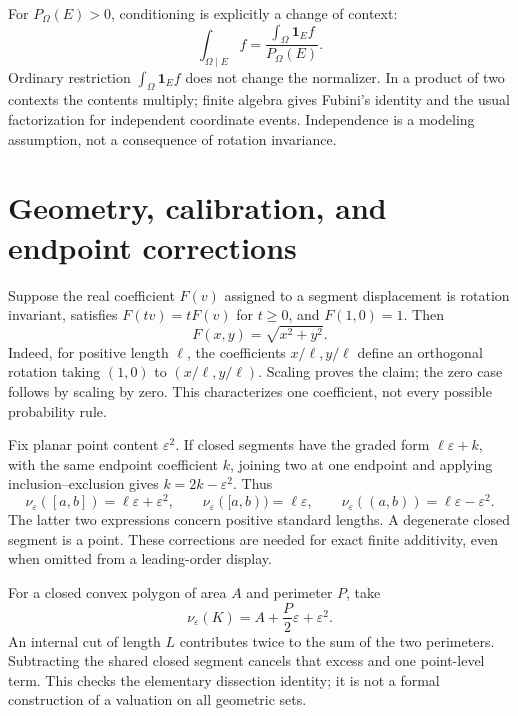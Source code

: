 \documentclass[11pt]{article}
\theoremstyle{definition}
\theoremstyle{remark}
\newcommand{\eps}{\varepsilon}
\newcommand{\nuE}{\nu_{\eps}}
\begin{document}
For $P_\Omega(E)>0$, conditioning is explicitly a change of context:
\[
 \int_{\Omega\mid E}f=
 \frac{\int_\Omega\mathbf1_E f}{P_\Omega(E)}.
\]
Ordinary restriction $\int_\Omega\mathbf1_E f$ does not change the
normalizer. In a product of two contexts the contents multiply;
finite algebra gives Fubini's identity and the usual factorization for
independent coordinate events. Independence is a modeling assumption,
not a consequence of rotation invariance.

\section{Geometry, calibration, and endpoint corrections}
Suppose the real coefficient $F(v)$ assigned to a segment displacement
is rotation invariant, satisfies $F(tv)=tF(v)$ for $t\geq0$, and
$F(1,0)=1$. Then
\[
 F(x,y)=\sqrt{x^2+y^2}.
\]
Indeed, for positive length $\ell$, the coefficients $x/\ell,y/\ell$
define an orthogonal rotation taking $(1,0)$ to $(x/\ell,y/\ell)$.
Scaling proves the claim; the zero case follows by scaling by zero.
This characterizes one coefficient, not every possible probability rule.

Fix planar point content $\eps^2$. If closed segments have the graded
form $\ell\eps+k$, with the same endpoint coefficient $k$, joining two
at one endpoint and applying inclusion--exclusion gives
$k=2k-\eps^2$. Thus
\begin{equation}\label{eq:segments}
 \nuE([a,b])=\ell\eps+\eps^2,\qquad
 \nuE([a,b))=\ell\eps,\qquad
 \nuE((a,b))=\ell\eps-\eps^2.
\end{equation}
The latter two expressions concern positive standard lengths. A
degenerate closed segment is a point. These corrections are needed for
exact finite additivity, even when omitted from a leading-order display.

For a closed convex polygon of area $A$ and perimeter $P$, take
\begin{equation}\label{eq:polygon}
 \nuE(K)=A+\frac P2\eps+\eps^2.
\end{equation}
An internal cut of length $L$ contributes twice to the sum of the two
perimeters. Subtracting the shared closed segment cancels that excess
and one point-level term. This checks the elementary dissection identity;
it is not a formal construction of a valuation on all geometric sets.
\end{document}
